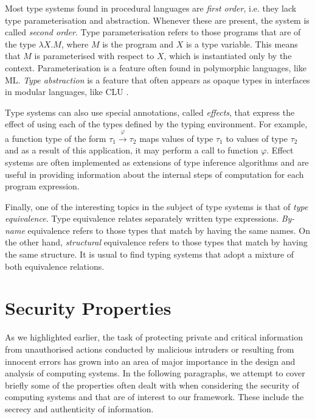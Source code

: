 \documentclass[10pt,a4paper,final,oneside,fleqn]{book}
\newcommand*{\effect}{\mathbin{\mathop{\to}\limits^{\varphi}}}
\begin{document}
Most type systems found in procedural languages are {\itshape first order\/}, i.e. they lack type parameterisation and abstraction.  Whenever these are present, the system is called {\itshape second order\/}.  Type parameterisation refers to those programs that are of the type $\lambda X.M$, where $M$ is the program and $X$ is a type variable.  This means that $M$ is parameterised with respect to $X$, which is instantiated only by the context.  Parameterisation is a feature often found in polymorphic languages, like ML.  {\itshape Type abstraction\/} is a feature that often appears as opaque types in interfaces in modular languages, like CLU \cite{liskov1}.

Type systems can also use special annotations, called {\itshape effects\/}, that express the effect of using each of the types defined by the typing environment.  For example, a function type of the form $\tau_1\effect\tau_2$ maps values of type $\tau_1$ to values of type $\tau_2$ and as a result of this application, it may perform a call to function $\varphi$. Effect systems are often implemented as extensions of type inference algorithms and are useful in providing information about the internal steps of computation for each program expression.

Finally, one of the interesting topics in the subject of type systems is that of {\itshape type equivalence\/}.  Type equivalence relates separately written type expressions.  {\itshape By-name\/} equivalence refers to those types that match by having the same names.  On the other hand, {\itshape structural\/} equivalence refers to those types that match by having the same structure. It is usual to find typing systems that adopt a mixture of both equivalence relations.
\section{Security Properties\label{sect:securityprop}}
As we highlighted earlier, the task of protecting private and critical information from unauthorised actions conducted by malicious intruders or resulting from innocent errors has grown into an area of major importance in the design and analysis of computing systems.  In the following paragraphs, we attempt to cover briefly some of the properties often dealt with when considering the security of computing systems and that are of interest to our framework.  These include the secrecy and authenticity of information.
\end{document}
